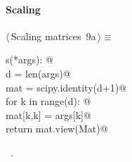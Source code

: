 \documentclass[11pt,oneside]{article}	%
\begin{document}
\paragraph{Scaling}
\begin{flushleft} \small \label{scrap18}
\protect{}$\langle\,$Scaling matrices\nobreak\ {\footnotesize 9a}$\,\rangle\equiv$
\vspace{-1ex}
\begin{list}{}{} \item
\mbox{}\verb@def s(*args): @\\
\mbox{}\verb@   d = len(args)@\\
\mbox{}\verb@   mat = scipy.identity(d+1)@\\
\mbox{}\verb@   for k in range(d): @\\
\mbox{}\verb@      mat[k,k] = args[k]@\\
\mbox{}\verb@   return mat.view(Mat)@\\
\mbox{}\verb@@{\NWsep}
\end{list}
\vspace{-1ex}
\footnotesize\addtolength{\baselineskip}{-1ex}
\begin{list}{}{\setlength{\itemsep}{-\parsep}\setlength{\itemindent}{-\leftmargin}}
\item \NWtxtMacroRefIn\ .
\end{list}
\end{flushleft}
\end{document}
